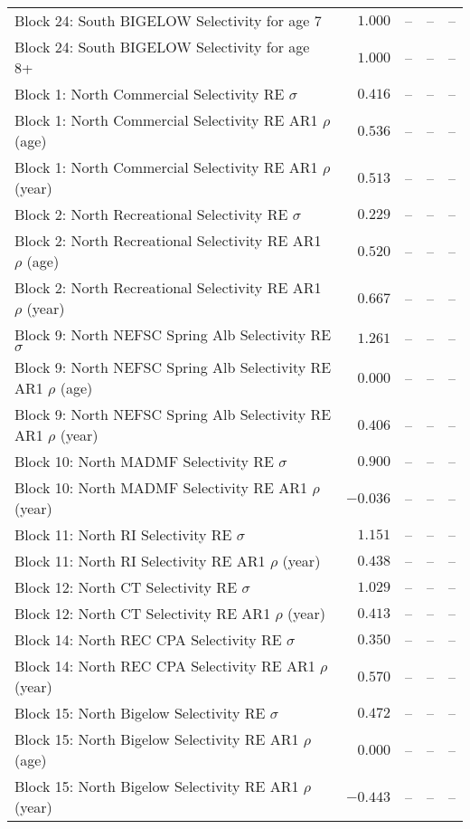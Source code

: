 \documentclass[
]{article}
\begin{document}
\begin{landscape}
\begin{longtable}[t]{lrrrr}
Block 24: South BIGELOW Selectivity for age 7 & $1.000$ & -- & -- & --\\
Block 24: South BIGELOW Selectivity for age 8+ & $1.000$ & -- & -- & --\\
Block 1: North Commercial Selectivity RE $\sigma$ & $0.416$ & -- & -- & --\\
\addlinespace
Block 1: North Commercial Selectivity RE AR1 $\rho$ (age) & $0.536$ & -- & -- & --\\
Block 1: North Commercial Selectivity RE AR1 $\rho$ (year) & $0.513$ & -- & -- & --\\
Block 2: North Recreational Selectivity RE $\sigma$ & $0.229$ & -- & -- & --\\
Block 2: North Recreational Selectivity RE AR1 $\rho$ (age) & $0.520$ & -- & -- & --\\
Block 2: North Recreational Selectivity RE AR1 $\rho$ (year) & $0.667$ & -- & -- & --\\
\addlinespace
Block 9: North NEFSC Spring Alb Selectivity RE $\sigma$ & $1.261$ & -- & -- & --\\
Block 9: North NEFSC Spring Alb Selectivity RE AR1 $\rho$ (age) & $0.000$ & -- & -- & --\\
Block 9: North NEFSC Spring Alb Selectivity RE AR1 $\rho$ (year) & $0.406$ & -- & -- & --\\
Block 10: North MADMF Selectivity RE $\sigma$ & $0.900$ & -- & -- & --\\
Block 10: North MADMF Selectivity RE AR1 $\rho$ (year) & $-0.036$ & -- & -- & --\\
\addlinespace
Block 11: North RI Selectivity RE $\sigma$ & $1.151$ & -- & -- & --\\
Block 11: North RI Selectivity RE AR1 $\rho$ (year) & $0.438$ & -- & -- & --\\
Block 12: North CT Selectivity RE $\sigma$ & $1.029$ & -- & -- & --\\
Block 12: North CT Selectivity RE AR1 $\rho$ (year) & $0.413$ & -- & -- & --\\
Block 14: North REC CPA Selectivity RE $\sigma$ & $0.350$ & -- & -- & --\\
\addlinespace
Block 14: North REC CPA Selectivity RE AR1 $\rho$ (year) & $0.570$ & -- & -- & --\\
Block 15: North Bigelow Selectivity RE $\sigma$ & $0.472$ & -- & -- & --\\
Block 15: North Bigelow Selectivity RE AR1 $\rho$ (age) & $0.000$ & -- & -- & --\\
Block 15: North Bigelow Selectivity RE AR1 $\rho$ (year) & $-0.443$ & -- & -- & --\\

\end{longtable}
\end{landscape}
\end{document}

